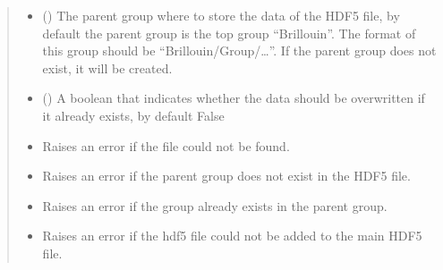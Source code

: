 \documentclass[letterpaper,10pt,english]{sphinxmanual}
\begin{document}
\begin{fulllineitems}
\begin{fulllineitems}
\begin{quote}
\begin{description}
\begin{itemize}
\item {} 
\sphinxAtStartPar
{} (\sphinxstyleliteralemphasis{\sphinxupquote{, }}) \textendash{} The parent group where to store the data of the HDF5 file, by default the parent group is the top group “Brillouin”. The format of this group should be “Brillouin/Group/…”. If the parent group does not exist, it will be created.

\item {} 
\sphinxAtStartPar
{} (\sphinxstyleliteralemphasis{\sphinxupquote{, }}) \textendash{} A boolean that indicates whether the data should be overwritten if it already exists, by default False

\end{itemize}

\begin{itemize}
\item {} 
\sphinxAtStartPar
{\hyperref[\detokenize{source/_autosummary/HDF5_BLS.errors:HDF5_BLS.errors.WrapperError_FileNotFound}]{}} \textendash{} Raises an error if the file could not be found.

\item {} 
\sphinxAtStartPar
{\hyperref[\detokenize{source/_autosummary/HDF5_BLS.errors:HDF5_BLS.errors.WrapperError_StructureError}]{}} \textendash{} Raises an error if the parent group does not exist in the HDF5 file.

\item {} 
\sphinxAtStartPar
{\hyperref[\detokenize{source/_autosummary/HDF5_BLS.errors:HDF5_BLS.errors.WrapperError_Overwrite}]{}} \textendash{} Raises an error if the group already exists in the parent group.

\item {} 
\sphinxAtStartPar
{\hyperref[\detokenize{source/_autosummary/HDF5_BLS.errors:HDF5_BLS.errors.WrapperError}]{}} \textendash{} Raises an error if the hdf5 file could not be added to the main HDF5 file.


\end{itemize}
\end{description}
\end{quote}
\end{fulllineitems}
\end{fulllineitems}
\end{document}
